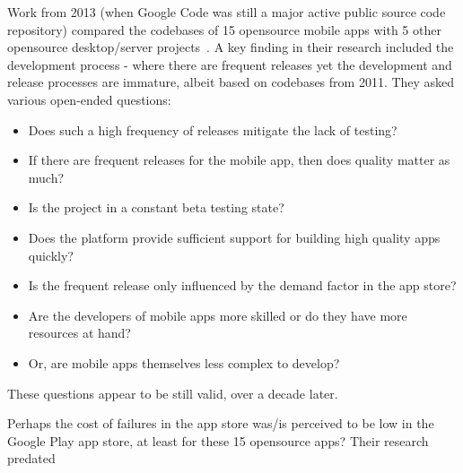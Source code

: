 Work from 2013 (when Google Code was still a major active public source code repository) compared the codebases of 15 opensource mobile apps with 5 other opensource desktop/server projects~. A key finding in their research included the development process - where there are frequent releases yet the development and release processes are immature, albeit based on codebases from 2011. They asked various open-ended questions:
    \begin{itemize}
        \item Does such a high frequency of releases mitigate the lack of testing? 
        \item If there are frequent releases for the mobile app, then does quality matter as much?
        \item Is the project in a constant beta testing state? 
        \item Does the platform provide sufficient support for building high quality apps quickly? 
        \item Is the frequent release only influenced by the demand factor in the app store? 
        \item Are the developers of mobile apps more skilled or do they have more resources at hand? 
        \item Or, are mobile apps themselves less complex to develop?
    \end{itemize}
    
These questions appear to be still valid, over a decade later.
    
Perhaps the cost of failures in the app store was/is perceived to be low in the Google Play app store, at least for these 15 opensource apps? Their research predated 

